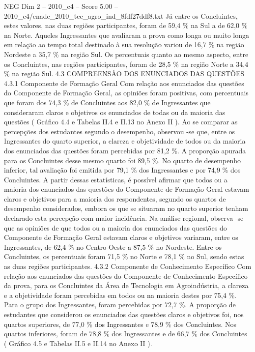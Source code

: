 \begin{textsample}{NEG Dim 2 – 2010\_c4 – Score 5.00 – 2010\_c4/enade\_2010\_tec\_agro\_ind\_8fdf27ddf8.txt}
Já entre os Concluintes, estes valores, nas duas regiões participantes, foram de 59,4 \% na Sul a de 62,0 \% na Norte.
Aqueles Ingressantes que avaliaram a prova como longa ou muito longa em relação ao tempo total destinado à sua resolução variou de 16,7 \% na região Nordeste a 35,7 \% na região Sul.
Os percentuais quanto ao mesmo aspecto, entre os Concluintes, nas regiões participantes, foram de 28,5 \% na região Norte a 34,4 \% na região Sul. 4.3 COMPREENSÃO DOS ENUNCIADOS DAS QUESTÕES 4.3.1 Componente de Formação Geral Com relação aos enunciados das questões do Componente de Formação Geral, as opiniões foram positivas, com percentuais que foram dos 74,3 \% de Concluintes aos 82,0 \% de Ingressantes que consideraram claros e objetivos os enunciados de todas ou da maioria das questões ( Gráfico 4.4 e Tabelas II.4 e II.13 no Anexo II ).
Ao se comparar as percepções dos estudantes segundo o desempenho, observou -se que, entre os Ingressantes do quarto superior, a clareza e objetividade de todos ou da maioria dos enunciados das questões foram percebidas por 81,2 \%.
A proporção apurada para os Concluintes desse mesmo quarto foi 89,5 \%.
No quarto de desempenho inferior, tal avaliação foi emitida por 79,1 \% dos Ingressantes e por 74,9 \% dos Concluintes.
A partir dessas estatísticas, é possível afirmar que todos ou a maioria dos enunciados das questões do Componente de Formação Geral estavam claros e objetivos para a maioria dos respondentes, segundo os quartos de desempenho considerados, embora os que se situaram no quarto superior tenham declarado esta percepção com maior incidência.
Na análise regional, observa -se que as opiniões de que todos ou a maioria dos enunciados das questões do Componente de Formação Geral estavam claros e objetivos variaram, entre os Ingressantes, de 62,4 \% no Centro-Oeste a 87,5 \% no Nordeste.
Entre os Concluintes, os percentuais foram 71,5 \% no Norte e 78,1 \% no Sul, sendo estas as duas regiões participantes. 4.3.2 Componente de Conhecimento Específico Com relação aos enunciados das questões do Componente de Conhecimento Específico da prova, para os Concluintes da Área de Tecnologia em Agroindústria, a clareza e a objetividade foram percebidas em todos ou na maioria destes por 75,4 \%.
Para o grupo dos Ingressantes, foram percebidas por 72,7 \%.
A proporção de estudantes que considerou os enunciados das questões claros e objetivos foi, nos quartos superiores, de 77,0 \% dos Ingressantes e 78,9 \% dos Concluintes.
Nos quartos inferiores, foram de 78,8 \% dos Ingressantes e de 66,7 \% dos Concluintes ( Gráfico 4.5 e Tabelas II.5 e II.14 no Anexo II ).

\end{textsample}
